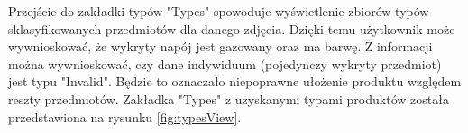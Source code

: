 {\begin{figure}[h]
\end{figure}

Przejście do zakładki typów "Types" spowoduje wyświetlenie zbiorów typów sklasyfikowanych przedmiotów dla danego zdjęcia. Dzięki temu użytkownik może wywnioskować, że wykryty napój jest gazowany oraz ma barwę. Z informacji można wywnioskować, czy dane indywiduum (pojedynczy wykryty przedmiot) jest typu "Invalid". Będzie to oznaczało niepoprawne ułożenie produktu względem reszty przedmiotów. Zakładka "Types" z uzyskanymi typami produktów została przedstawiona na rysunku \ref{fig:typesView}.

\begin{figure}[h]
	\centering
	\quad

\end{figure}}
